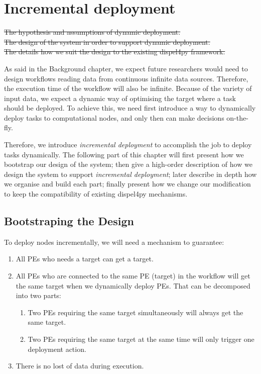 \chapter{Incremental deployment}
\sout{The hypothesis and assumptions of dynamic deployment. \\
The design of the system in order to support dynamic deployment. \\
The details how we suit the design to the existing dispel4py framework.}

As said in the Background chapter, we expect future researchers would need to design workflows reading data from continuous infinite data sources. Therefore, the execution time of the workflow will also be infinite. Because of the variety of input data, we expect a dynamic way of optimising the target where a task should be deployed. To achieve this, we need first introduce a way to dynamically deploy tasks to computational nodes, and only then can make decisions on-the-fly.

Therefore, we introduce \emph{incremental deployment} to accomplish the job to deploy tasks dynamically. The following part of this chapter will first present how we bootstrap our design of the system; then give a high-order description of how we design the system to support \emph{incremental deployment}; later describe in depth how we organise and build each part; finally present how we change our modification to keep the compatibility of existing dispel4py mechanisms.

\section{Bootstraping the Design}
To deploy nodes incrementally, we will need a mechanism to guarantee:
\begin{enumerate}
	\item All PEs who needs a target can get a target.
	\item All PEs who are connected to the same PE (target) in the workflow will get the same target when we dynamically deploy PEs. That can be decomposed into two parts:
	\begin{enumerate}
		\item Two PEs requiring  the same target simultaneously will always get the same target.
		\item Two PEs requiring the same target at the same time will only trigger one deployment action.
	\end{enumerate}
	\item There is no lost of data during execution.
\end{enumerate}

